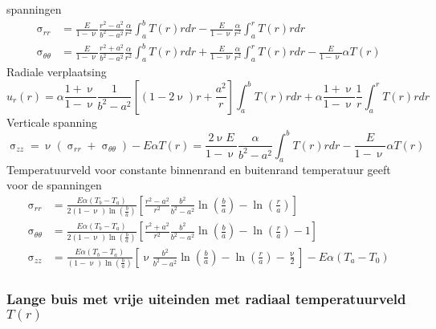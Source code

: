             spanningen
            \begin{align}
                \upsigma_{rr} &= \frac{E}{1-\upnu}\frac{r^2-a^2}{b^2-a^2}\frac{\alpha}{r^2}\int_a^bT(r)rdr-\frac{E}{1-\upnu}\frac{\alpha}{r^2}\int_a^rT(r)rdr\nonumber\\
                \upsigma_{\theta\theta} &= \frac{E}{1-\upnu}\frac{r^2+a^2}{b^2-a^2}\frac{\alpha}{r^2}\int_a^bT(r)rdr+\frac{E}{1-\upnu}\frac{\alpha}{r^2}\int_a^rT(r)rdr-\frac{E}{1-\upnu}\alpha T(r)
            \end{align}
            Radiale verplaatsing
            \begin{equation}
                u_r(r) = \alpha\frac{1+\upnu}{1-\upnu}\frac{1}{b^2-a^2}\left[(1-2\upnu)r+\frac{a^2}{r}\right]\int_a^bT(r)rdr + \alpha\frac{1+\upnu}{1-\upnu}\frac{1}{r}\int_a^rT(r)rdr
            \end{equation}
            Verticale spanning
            \begin{equation}
                \upsigma_{zz} = \upnu(\upsigma_{rr}+\upsigma_{\theta\theta}) - E\alpha T(r) = \frac{2\upnu E}{1-\upnu}\frac{\alpha}{b^2-a^2}\int_a^bT(r)rdr-\frac{E}{1-\upnu}\alpha T(r)
            \end{equation}
            Temperatuurveld voor constante binnenrand en buitenrand temperatuur geeft voor de spanningen
            \begin{align}
                \upsigma_{rr} & = \frac{E\alpha(T_b-T_a)}{2(1-\upnu)\ln\left(\frac{b}{a}\right)}\left[\frac{r^2-a^2}{r^2}\frac{b^2}{b^2-a^2}\ln\left(\frac{b}{a}\right)-\ln\left(\frac{r}{a}\right)\right]\nonumber\\
                \upsigma_{\theta\theta} & = \frac{E\alpha(T_b-T_a)}{2(1-\upnu)\ln\left(\frac{b}{a}\right)}\left[\frac{r^2+a^2}{r^2}\frac{b^2}{b^2-a^2}\ln\left(\frac{b}{a}\right)-\ln\left(\frac{r}{a}\right)-1\right]\\
                \upsigma_{zz} & = \frac{E\alpha(T_b-T_a)}{(1-\upnu)\ln\left(\frac{b}{a}\right)}\left[\upnu\frac{b^2}{b^2-a^2}\ln\left(\frac{b}{a}\right)-\ln\left(\frac{r}{a}\right)-\frac{\upnu}{2}\right] - E\alpha(T_a-T_0)
            \end{align}
        
        \subsubsection{Lange buis met vrije uiteinden met radiaal temperatuurveld $T(r)$}

